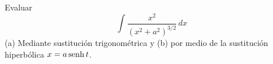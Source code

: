 \item Evaluar
    \[ \int \frac{x^2}{(x^2 + a^2)^{3/2}} \, dx \]
    (a) Mediante sustitución trigonométrica y (b) por medio de la sustitución hiperbólica $x = a \operatorname{senh} t$.
